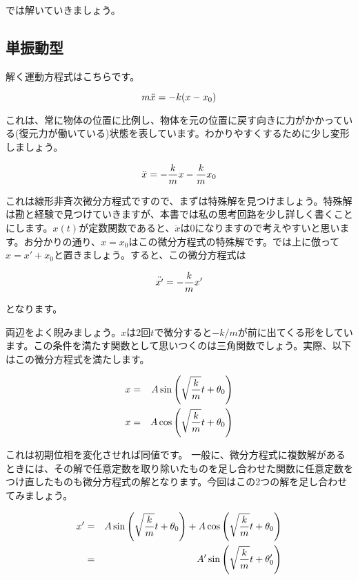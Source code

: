 では解いていきましょう。




\subsection{単振動型}
\label{vibration}
解く運動方程式はこちらです。

\begin{equation}
    m\ddot{x} = -k(x - x_0) \notag
\end{equation}

これは、常に物体の位置に比例し、物体を元の位置に戻す向きに力がかかっている(復元力が働いている)状態を表しています。わかりやすくするために少し変形しましょう。

\begin{equation}
    \ddot{x} = -\frac{k}{m}x - \frac{k}{m}x_0 \notag
\end{equation}

これは線形非斉次微分方程式ですので、まずは特殊解を見つけましょう。特殊解は勘と経験で見つけていきますが、本書では私の思考回路を少し詳しく書くことにします。$x(t)$が定数関数であると、$\ddot{x}$は$0$になりますので考えやすいと思います。お分かりの通り、$x=x_0$はこの微分方程式の特殊解です。では上に倣って$x=x'+x_0$と置きましょう。すると、この微分方程式は

\begin{equation}
    \ddot{x'} = -\frac{k}{m}x' \notag
\end{equation}

となります。

両辺をよく睨みましょう。$x$は2回$t$で微分すると$-k/m$が前に出てくる形をしています。この条件を満たす関数として思いつくのは三角関数でしょう。実際、以下はこの微分方程式を満たします。

\begin{eqnarray}
    x &=& A\sin\left(\sqrt{\frac{k}{m}}t+\theta_0\right) \notag \\
    x &=& A\cos\left(\sqrt{\frac{k}{m}}t+\theta_0\right) \notag
\end{eqnarray}

これは初期位相を変化させれば同値です。
一般に、微分方程式に複数解があるときには、その解で任意定数を取り除いたものを足し合わせた関数に任意定数をつけ直したものも微分方程式の解となります。今回はこの2つの解を足し合わせてみましょう。

\begin{eqnarray}
    x' &=& A\sin\left(\sqrt{\frac{k}{m}}t+\theta_0\right) + A\cos\left(\sqrt{\frac{k}{m}}t+\theta_0\right) \notag \\
      &=& A'\sin\left(\sqrt{\frac{k}{m}}t+\theta_0'\right) \notag
\end{eqnarray}

